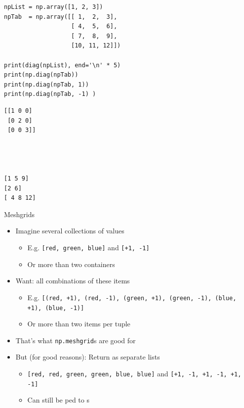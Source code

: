 \begin{frame}[fragile]
%
\begin{tcbraster}[raster columns=2,
                  raster equal height,
                  nobeforeafter,
                  raster column skip=0.2cm]
\begin{codebox}
\begin{verbatim}
npList = np.array([1, 2, 3])
npTab  = np.array([[ 1,  2,  3],
                   [ 4,  5,  6],
                   [ 7,  8,  9],
                   [10, 11, 12]])

print(diag(npList), end='\n' * 5)
print(np.diag(npTab))
print(np.diag(npTab, 1))
print(np.diag(npTab, -1) )
\end{verbatim}
\end{codebox}
%
\begin{cmdbox}
\begin{verbatim}
[[1 0 0]
 [0 2 0]
 [0 0 3]]




[1 5 9]
[2 6]
[ 4 8 12]
\end{verbatim}
\end{cmdbox}
\end{tcbraster}
%
\end{frame}


\begin{frame}{Meshgrids}
%
\begin{itemize}
\item Imagine several collections of values
	\begin{itemize}
	\item E.\;g. \texttt{[red, green, blue]} and \texttt{[+1, -1]}
	\item Or more than two containers
	\end{itemize}
\item Want: all combinations of these items
	\begin{itemize}
	\item E.\;g. \texttt{[(red, +1), (red, -1), (green, +1), (green, -1), (blue, +1), (blue, -1)]}\\
	\item Or more than two items per tuple
	\end{itemize}
\item That's what \texttt{np.meshgrid}s are good for
\item But (for good reasons): Return as separate lists
	\begin{itemize}
	\item \texttt{[red, red, green, green, blue, blue]} and \texttt{[+1, -1, +1, -1, +1, -1]}
	\item Can still be ped to s
	\end{itemize}
\end{itemize}
%
\end{frame}

